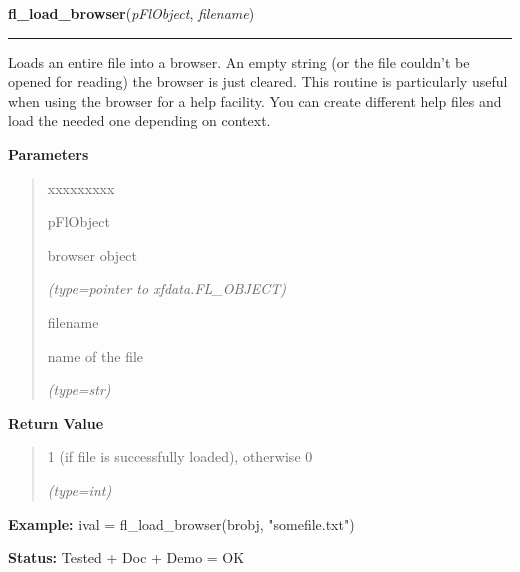     \vspace{0.5ex}

\hspace{.8\funcindent}\begin{boxedminipage}{\funcwidth}

    \raggedright \textbf{fl\_load\_browser}(\textit{pFlObject}, \textit{filename})

    \vspace{-1.5ex}

    \rule{\textwidth}{0.5\fboxrule}
\setlength{\parskip}{2ex}
    Loads an entire file into a browser. An empty string (or the file 
    couldn't be opened for reading) the browser is just cleared. This 
    routine is particularly useful when using the browser for a help 
    facility. You can create different help files and load the needed one 
    depending on context.

\setlength{\parskip}{1ex}
      \textbf{Parameters}
      \vspace{-1ex}

      \begin{quote}
        \begin{Ventry}{xxxxxxxxx}

          \item[pFlObject]

          browser object

            {\it (type=pointer to xfdata.FL\_OBJECT)}

          \item[filename]

          name of the file

            {\it (type=str)}

        \end{Ventry}

      \end{quote}

      \textbf{Return Value}
    \vspace{-1ex}

      \begin{quote}
      1 (if file is successfully loaded), otherwise 0

      {\it (type=int)}

      \end{quote}

\textbf{Example:} ival = fl\_load\_browser(brobj, "somefile.txt")



\textbf{Status:} Tested + Doc + Demo = OK



    \end{boxedminipage}


